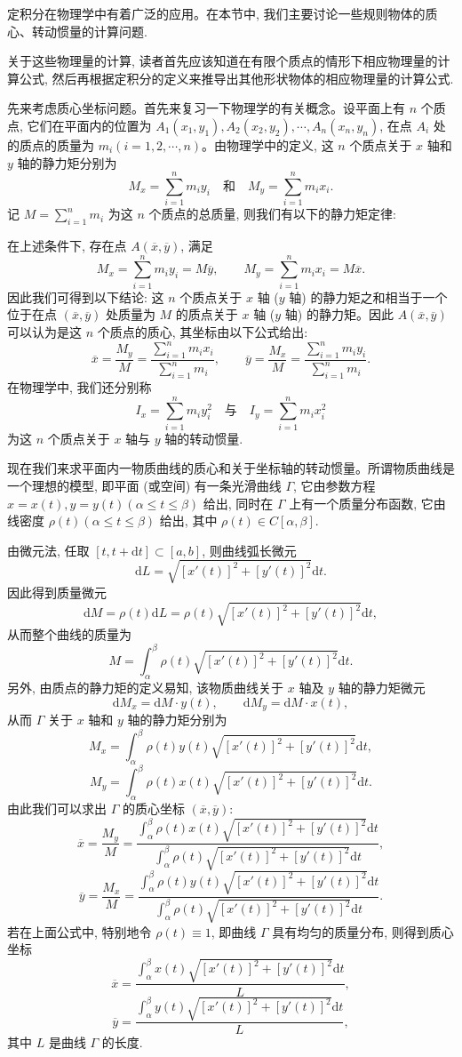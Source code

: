 定积分在物理学中有着广泛的应用。在本节中, 我们主要讨论一些规则物体的质心、转动惯量的计算问题.

关于这些物理量的计算, 读者首先应该知道在有限个质点的情形下相应物理量的计算公式, 然后再根据定积分的定义来推导出其他形状物体的相应物理量的计算公式.

先来考虑质心坐标问题。首先来复习一下物理学的有关概念。设平面上有 $n$ 个质点, 它们在平面内的位置为 $A_1(x_1,y_1),A_2(x_2,y_2),\cdots,A_n(x_n,y_n)$, 在点 $A_i$ 处的质点的质量为 $m_i(i=1,2,\cdots,n)$。由物理学中的定义, 这 $n$ 个质点关于 $x$ 轴和 $y$ 轴的静力矩分别为
\[
  M_x=\sum_{i=1}^n m_i y_i\quad\text{和}\quad M_y=\sum_{i=1}^n m_i x_i.
\]
记 $M=\sum_{i=1}^n m_i$ 为这 $n$ 个质点的总质量, 则我们有以下的静力矩定律:

在上述条件下, 存在点 $A(\overline x,\overline y)$, 满足
\[
  M_x=\sum_{i=1}^n m_i y_i=M\overline y,\qquad
  M_y=\sum_{i=1}^n m_i x_i=M\overline x.
\]
因此我们可得到以下结论: 这 $n$ 个质点关于 $x$ 轴 ($y$ 轴) 的静力矩之和相当于一个位于在点 $(\overline x,\overline y)$ 处质量为 $M$ 的质点关于 $x$ 轴 ($y$ 轴) 的静力矩。因此 $A(\overline x,\overline y)$ 可以认为是这 $n$ 个质点的质心, 其坐标由以下公式给出:
\[
  \overline x=\frac{M_y}{M}
  =\frac{\sum_{i=1}^n m_i x_i}{\sum_{i=1}^n m_i},\qquad
  \overline y=\frac{M_x}{M}
  =\frac{\sum_{i=1}^n m_i y_i}{\sum_{i=1}^n m_i}.
\]
在物理学中, 我们还分别称
\[
  I_x=\sum_{i=1}^n m_i y_i^2\quad\text{与}\quad I_y=\sum_{i=1}^n m_i x_i^2
\]
为这 $n$ 个质点关于 $x$ 轴与 $y$ 轴的转动惯量.

现在我们来求平面内一物质曲线的质心和关于坐标轴的转动惯量。所谓物质曲线是一个理想的模型, 即平面 (或空间) 有一条光滑曲线 $\Gamma$, 它由参数方程 $x=x(t),y=y(t)(\alpha\leq t\leq\beta)$ 给出, 同时在 $\Gamma$ 上有一个质量分布函数, 它由线密度 $\rho(t)(\alpha\leq t\leq\beta)$ 给出, 其中 $\rho(t)\in C[\alpha,\beta]$.

由微元法, 任取 $[t,t+\mathrm dt]\subset[a,b]$, 则曲线弧长微元
\[
  \mathrm dL=\sqrt{[x'(t)]^2+[y'(t)]^2}\mathrm dt.
\]
因此得到质量微元
\[
  \mathrm dM=\rho(t)\mathrm dL=\rho(t)\sqrt{[x'(t)]^2+[y'(t)]^2}\mathrm dt,
\]
从而整个曲线的质量为
\[
  M=\int_\alpha^\beta \rho(t)\sqrt{[x'(t)]^2+[y'(t)]^2}\mathrm dt.
\]
另外, 由质点的静力矩的定义易知, 该物质曲线关于 $x$ 轴及 $y$ 轴的静力矩微元
\[
  \mathrm dM_x=\mathrm dM\cdot y(t),\qquad
  \mathrm dM_y=\mathrm dM\cdot x(t),
\]
从而 $\Gamma$ 关于 $x$ 轴和 $y$ 轴的静力矩分别为
\[
  M_x=\int_\alpha^\beta \rho(t)y(t)\sqrt{[x'(t)]^2+[y'(t)]^2}\mathrm dt,
\]
\[
  M_y=\int_\alpha^\beta \rho(t)x(t)\sqrt{[x'(t)]^2+[y'(t)]^2}\mathrm dt.
\]
由此我们可以求出 $\Gamma$ 的质心坐标 $(\overline x,\overline y)$:
\[
  \overline x=\frac{M_y}{M}
  =\frac{\int_\alpha^\beta \rho(t)x(t)\sqrt{[x'(t)]^2+[y'(t)]^2}\mathrm dt}
  {\int_\alpha^\beta \rho(t)\sqrt{[x'(t)]^2+[y'(t)]^2}\mathrm dt},
\]
\[
  \overline y=\frac{M_x}{M}
  =\frac{\int_\alpha^\beta \rho(t)y(t)\sqrt{[x'(t)]^2+[y'(t)]^2}\mathrm dt}
  {\int_\alpha^\beta \rho(t)\sqrt{[x'(t)]^2+[y'(t)]^2}\mathrm dt}.
\]
若在上面公式中, 特别地令 $\rho(t)\equiv1$, 即曲线 $\Gamma$ 具有均匀的质量分布, 则得到质心坐标
\[
  \overline x=\frac{\int_\alpha^\beta x(t)\sqrt{[x'(t)]^2+[y'(t)]^2}\mathrm dt}{L},
\]
\[
  \overline y=\frac{\int_\alpha^\beta y(t)\sqrt{[x'(t)]^2+[y'(t)]^2}\mathrm dt}{L},
\]
其中 $L$ 是曲线 $\Gamma$ 的长度.

